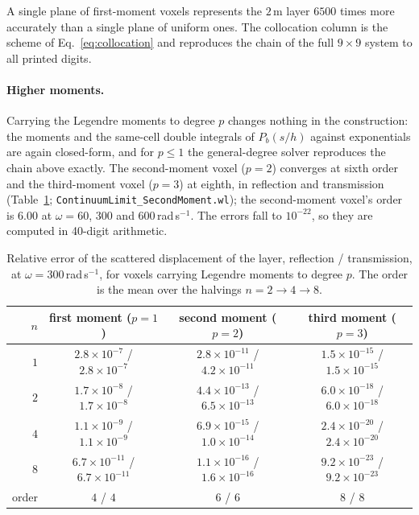 \documentclass[11pt,a4paper]{article}
\newcommand{\nb}[1]{\texttt{#1}}
\begin{document}
A single plane of first-moment
voxels represents the $2$\,m layer $6500$ times more accurately than a single plane of uniform ones.
The collocation column is the scheme of Eq.~\eqref{eq:collocation} and reproduces the chain of the full
$9\times9$ system to all printed digits.

\paragraph{Higher moments.} Carrying the Legendre moments to degree $p$ changes nothing in the
construction: the moments and the same-cell double integrals of $P_b(s/h)$ against exponentials are
again closed-form, and for $p\le1$ the general-degree solver reproduces the chain above exactly. The
second-moment voxel ($p=2$) converges at sixth order and the third-moment voxel ($p=3$) at eighth, in
reflection and transmission (Table~\ref{tab:layerhigher}; \nb{ContinuumLimit\_SecondMoment.wl}); the
second-moment voxel's order is $6.00$ at $\omega=60$, $300$ and $600$\,rad\,s$^{-1}$. The errors fall to
$10^{-22}$, so they are computed in 40-digit arithmetic.
\begin{table}[htbp]
\centering
\caption{Relative error of the scattered displacement of the layer, reflection / transmission, at
$\omega=300$\,rad\,s$^{-1}$, for voxels carrying Legendre moments to degree $p$. The order is the mean
over the halvings $n=2\to4\to8$.}\label{tab:layerhigher}
\small\setlength{\tabcolsep}{4pt}
\begin{tabular}{@{}rccc@{}}
\toprule
$n$ & first moment ($p=1$) & second moment ($p=2$) & third moment ($p=3$) \\
\midrule
$1$ & $2.8\times10^{-7}$ / $2.8\times10^{-7}$ & $2.8\times10^{-11}$ / $4.2\times10^{-11}$ &
      $1.5\times10^{-15}$ / $1.5\times10^{-15}$ \\
$2$ & $1.7\times10^{-8}$ / $1.7\times10^{-8}$ & $4.4\times10^{-13}$ / $6.5\times10^{-13}$ &
      $6.0\times10^{-18}$ / $6.0\times10^{-18}$ \\
$4$ & $1.1\times10^{-9}$ / $1.1\times10^{-9}$ & $6.9\times10^{-15}$ / $1.0\times10^{-14}$ &
      $2.4\times10^{-20}$ / $2.4\times10^{-20}$ \\
$8$ & $6.7\times10^{-11}$ / $6.7\times10^{-11}$ & $1.1\times10^{-16}$ / $1.6\times10^{-16}$ &
      $9.2\times10^{-23}$ / $9.2\times10^{-23}$ \\
order & $4$ / $4$ & $6$ / $6$ & $8$ / $8$ \\
\bottomrule
\end{tabular}
\end{table}
\end{document}
